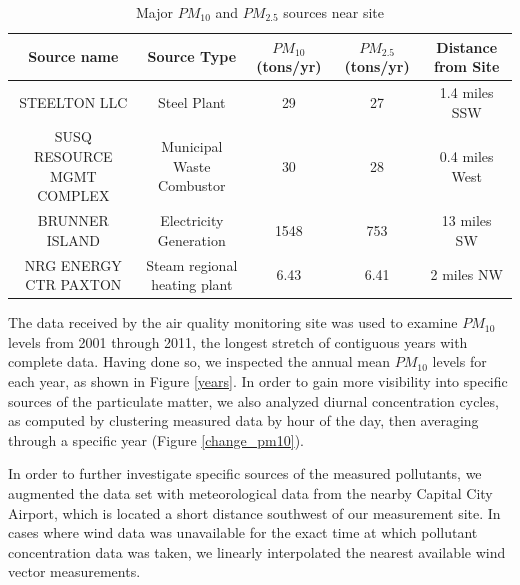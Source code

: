 \documentclass[11pt,journal]{IEEEtran}
\begin{document}
\begin{table}[!t]
\renewcommand{\arraystretch}{1.3}
\caption{Major $PM_{10}$ and $PM_{2.5}$ sources near site}
\label{major_sources}
\centering
\begin{tabular}{|c|c|c|c|c|}
\hline

Source name &
Source Type &
$PM_{10}$ (tons/yr) &
$PM_{2.5}$ (tons/yr) &
Distance from Site\\
\hline
STEELTON LLC &
Steel Plant &
29 &
27 &
1.4 miles SSW\\

\hline

SUSQ RESOURCE MGMT COMPLEX &
Municipal Waste Combustor &
30 &
28 &
0.4 miles West\\

\hline

BRUNNER ISLAND &
Electricity Generation &
1548 &
753 &
13 miles SW\\

\hline

NRG ENERGY CTR PAXTON &
Steam regional heating plant &
6.43 &
6.41 &
2 miles NW\\

\hline
\end{tabular}
\end{table}

The data received by the air quality monitoring site was used to examine $PM_{10}$ levels from 2001 through 2011, the longest stretch of contiguous years with complete data. 
Having done so, we inspected the annual mean $PM_{10}$ levels for each year, as shown in Figure \ref{years}. In order to gain more visibility into specific sources of the particulate matter, we also analyzed diurnal concentration cycles, as computed by clustering measured data by hour of the day, then averaging through a specific year (Figure \ref{change_pm10}).

In order to further investigate specific sources of the measured pollutants, we augmented the data set with meteorological data from the nearby Capital City Airport, which is located a short distance southwest of our measurement site. In cases where wind data was unavailable for the exact time at which pollutant concentration data was taken, we linearly interpolated the nearest available wind vector measurements.
\end{document}

